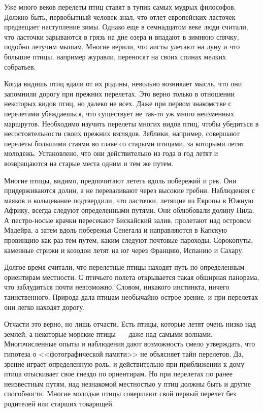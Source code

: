 \documentclass[12pt,a4paper,twoside,openany,svgnames]{memoir}
\begin{document}
Уже много веков перелеты птиц ставят в тупик самых мудрых философов. Должно быть, первобытный человек знал, что отлет европейских ласточек предвещает наступление зимы. Однако еще в семнадцатом веке люди считали, что ласточки зарываются в грязь на дне озера и впадают в зимнюю спячку, подобно летучим мышам. Многие верили, что аисты улетают на луну и что большие птицы, например журавли, переносят на своих спинах мелких собратьев.

Когда видишь птиц вдали от их родины, невольно возникает мысль, что они запомнили дорогу при прежних перелетах. Это верно только в отношении некоторых видов птиц, но далеко не всех. Даже при первом знакомстве с перелетами убеждаешься, что существует не так-то уж много неизменных маршрутов. Необходимо изучить перелеты многих видов птиц, чтобы убедиться в несостоятельности своих прежних взглядов. Зяблики, например, совершают перелеты большими стаями во главе со старыми птицами, за которыми летит молодежь. Установлено, что они действительно из года в год летят и возвращаются на старые места одним и тем же путем.

Многие птицы, видимо, предпочитают лететь вдоль побережий и рек. Они придерживаются долин, а не переваливают через высокие гребни. Наблюдения с маяков и кольцевание подтвердили, что ласточки, летящие из Европы в Южную Африку, всегда следуют определенными путями. Они облюбовали долину Нила. А пестро-носые крачки пересекают Бискайский залив, пролетают над островом Мадейра, а затем вдоль побережья Сенегала и направляются в Капскую провинцию как раз тем путем, каким следуют почтовые пароходы. Сорокопуты, каменные стрижи и козодои летят на юг через Францию, Испанию и Сахару.

Долгое время считали, что перелетные птицы находят путь по определенным ориентирам местности. С птичьего полета открывается такая обширная панорама, что заблудиться почти невозможно. Словом, никакого инстинкта, ничего таинственного. Природа дала птицам необычайно острое зрение, и при перелетах они легко находят дорогу.

Отчасти это верно, но лишь отчасти. Есть птицы, которые летят очень низко над землей, а некоторые морские птицы~--- даже над самыми волнами. Многочисленные опыты и наблюдения дают возможность смело утверждать, что гипотеза о <<фотографической памяти>> не объясняет тайн перелетов. Да, зрение играет определенную роль, и действительно при приближении к дому птица отыскивает свое гнездо по ориентирам. Но при перелетах по ранее неизвестным путям, над незнакомой местностью у птиц должны быть и другие способности. Многие молодые птицы совершают свой первый перелет без родителей или старших товарищей.
\end{document}

